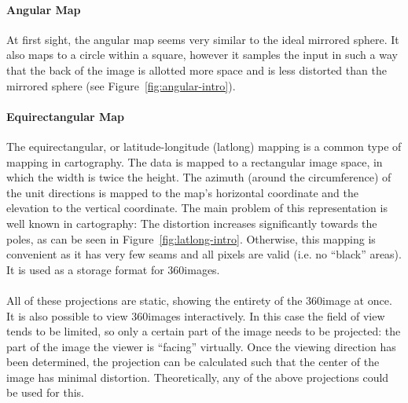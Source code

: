 \paragraph{Angular Map}
At first sight, the angular map seems very similar to the ideal mirrored sphere. It also maps to a circle within a square, however it samples the input in such a way that the back of the image is allotted more space and is less distorted than the mirrored sphere (see Figure~\ref{fig:angular-intro}).
\cite[p. 537]{hdrbook}

\paragraph{Equirectangular Map}
The equirectangular, or latitude-longitude (latlong) mapping is a common type of mapping in cartography. The data is mapped to a rectangular image space, in which the width is twice the height. The azimuth (around the circumference) of the unit directions is mapped to the map's horizontal coordinate and the elevation to the vertical coordinate. The main problem of this representation is well known in cartography: The distortion increases significantly towards the poles, as can be seen in Figure~\ref{fig:latlong-intro}. Otherwise, this mapping is convenient as it has very few seams and all pixels are valid (i.e. no ``black'' areas). It is used as a storage format for 360\degree images.
\cite[p. 538]{hdrbook}

\paragraph*{}
All of these projections are static, showing the entirety of the 360\degree image at once. It is also possible to view 360\degree images interactively. In this case the field of view tends to be limited, so only a certain part of the image needs to be projected: the part of the image the viewer is ``facing'' virtually. Once the viewing direction has been determined, the projection can be calculated such that the center of the image has minimal distortion. Theoretically, any of the above projections could be used for this. 

